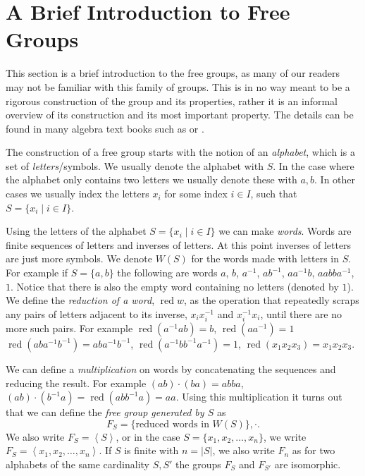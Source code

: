 \documentclass[titlepage, a4paper]{article}
\newcommand{\card}[1]{\left| #1 \right|}
\DeclareMathOperator{\red}{red}
\theoremstyle{remark}
\begin{document}
	\section{A Brief Introduction to Free Groups} \label{sec:intro_free_group}
This section is a brief introduction to the free groups, as many of our readers may not be familiar with this family of groups. 
This is in no way meant to be a rigorous construction of the group and its properties, rather it is an informal overview of its construction and its most important property.
The details can be found in many algebra text books such as \cite[section 7.9]{artin_algebra_1991} or \cite[section 5.5]{rotman_advanced_2015}.

The construction of a free group starts with the notion of an \emph{alphabet}, which is a set of \emph{letters}/symbols. We usually denote the alphabet with $S$. In the case where the alphabet only contains two letters we usually denote these with  $a,b$. In other cases we usually index the letters $x_i$ for some index $i \in I$, such that  $S = \{x_i  \mid i \in I\} $.

Using the letters of the alphabet  $S = \{x_i \mid i \in I\} $ we can make \emph{words}. Words are finite sequences of letters and inverses of letters. At this point inverses of letters are just more symbols. We denote $W(S)$ for the words made with letters in $S$. For example if $S = \{a,b\} $ the following are words $a$, $b$, $a^{-1}$, $ab^{-1}$, $aa^{-1}b$, $aabba^{-1}$, $1$. Notice that there is also the empty word containing no letters (denoted by $1$). 
We define the \emph{reduction of a word}, $\red w$,  as the operation that repeatedly scraps any pairs of letters adjacent to its inverse, $x_ix_i^{-1}$ and $x_i^{-1}x_i$, until there are no more such pairs. 
For example $\red({a^{-1}ab}) = b$, $\red(a a^{-1}) =1$ $\red(aba^{-1}b^{-1}) = aba^{-1}b^{-1}$, $\red(a^{-1}bb^{-1}a^{-1}) = 1$, $\red(x_1x_2x_3) = x_1x_2x_3$.

We can define a \emph{multiplication} on words by concatenating the sequences and reducing the result. For example $(ab)\cdot (ba) = abba$, $(ab)\cdot(b^{-1}a) = \red(abb^{-1}a) = aa$.
Using this multiplication it turns out that we can define the \emph{free group generated by $S$} as  \[
	F_S = \{\text{reduced words in $W(S)$}\}, \cdot  
.\]
We also write $F_S = \left<S \right>$, or in the case $S = \{x_1, x_2, \ldots, x_n\} $, we write $F_S = \left<x_1, x_2, \ldots, x_n \right>$. If  $S$ is finite with  $n = \card{S}$, we also write  $F_n$ as for two alphabets of the same cardinality  $S, S'$ the groups $F_S$ and $F_{S'}$ are isomorphic.
\end{document}
